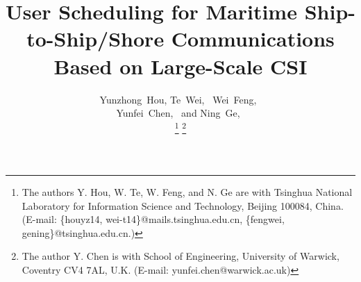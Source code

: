 \documentclass[journal]{IEEEtran}
\begin{document}
 \title{User Scheduling for Maritime Ship-to-Ship/Shore Communications Based on Large-Scale CSI}
 \author{Yunzhong~Hou, Te~Wei,~  Wei~Feng,~ \\ Yunfei~Chen,~  and Ning~Ge,~
  
 
 
 \thanks{The authors Y. Hou, W. Te, W. Feng, and N. Ge are with Tsinghua National Laboratory for Information Science and Technology, Beijing 100084, China. (E-mail: \{houyz14, wei-t14\}@mails.tsinghua.edu.cn, \{fengwei, gening\}@tsinghua.edu.cn.)}
 \thanks{The author Y. Chen is with School of Engineering, University of Warwick, Coventry CV4 7AL, U.K. (E-mail: yunfei.chen@warwick.ac.uk)}
 }
 
 
 
 
  
 
 \maketitle
 
\end{document}

